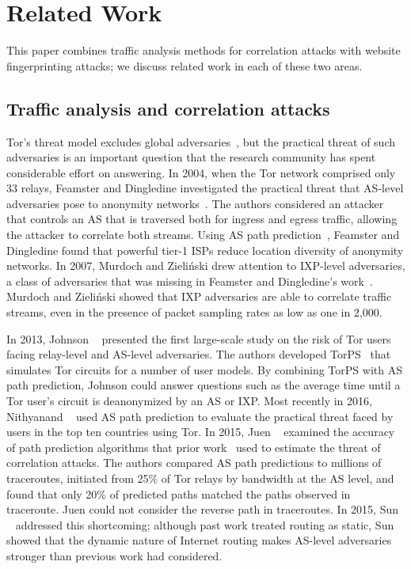 \section{Related Work}
\label{sec:related_work}

This paper combines traffic analysis methods for correlation attacks
with website fingerprinting attacks; we discuss related work in each of
these two areas.

\subsection{Traffic analysis and correlation attacks}
Tor's threat model excludes global adversaries~\cite{dingledine2004a}, but the
practical threat of such adversaries is an important question that the
research community has
spent considerable effort on answering.  In 2004, when the Tor network comprised
only 33 relays, Feamster and Dingledine investigated the practical threat that
AS-level adversaries pose to anonymity networks~\cite{Feamster2004a}.
The authors considered an attacker that controls an AS
that is traversed both for ingress and egress traffic, allowing the
attacker to correlate both streams.  Using AS path prediction~\cite{Gao2001a},
Feamster and Dingledine found that powerful tier-1 ISPs reduce location
diversity of anonymity networks.  In 2007, Murdoch and Zieli\'{n}ski drew
attention to IXP-level adversaries, a class of adversaries that was missing in
Feamster and Dingledine's work~\cite{Murdoch2007a}.  Murdoch and Zieli\'{n}ski
showed that IXP adversaries are able to correlate traffic streams, even in the
presence of packet sampling rates as low as one in 2,000.

In 2013, Johnson
\ea~\cite{Johnson2013a} presented the first large-scale study on the risk of Tor
users facing relay-level and AS-level adversaries.  The authors developed
TorPS~\cite{TorPS} that simulates Tor circuits for a number
of user models.  By combining TorPS with AS path
prediction, Johnson \ea could answer questions such as the average time until a
Tor user's circuit is deanonymized by an AS or IXP.  Most recently in 2016,
Nithyanand \ea~\cite{Nithyanand2016a} used AS path prediction to evaluate the
practical threat faced by users in the top ten countries using Tor.  In 2015,
Juen \ea~\cite{Juen2015a} examined the accuracy of path prediction algorithms
that prior work~\cite{Johnson2013a,Feamster2004a} used to estimate the threat of
correlation attacks.  The authors compared AS path predictions to millions of
traceroutes, initiated from 25\% of Tor relays by bandwidth at the
AS level, and found that
only 20\% of predicted paths matched the paths observed in traceroute.
Juen \ea could not consider the reverse path in traceroutes.  In 2015,
Sun \ea~\cite{Sun2015a} addressed this shortcoming; although past work treated
routing as static, Sun \ea showed that the dynamic nature of Internet
routing makes AS-level adversaries stronger than previous work had considered.

